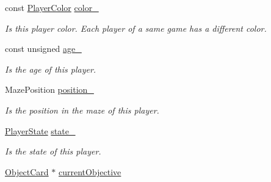 \begin{DoxyCompactItemize}
\item 
\mbox{\label{structlabyrinth_1_1_player_a64d4a2733ff15d2c0391a5d4bf54517b}} 
const \mbox{\hyperlink{structlabyrinth_1_1_player_a23119c6cf615f70b86380d07ab692c75}{Player\+Color}} \mbox{\hyperlink{structlabyrinth_1_1_player_a64d4a2733ff15d2c0391a5d4bf54517b}{color\+\_\+}}
\begin{DoxyCompactList}\small\item\em Is this player color. Each player of a same game has a different color. \end{DoxyCompactList}\item 
\mbox{\label{structlabyrinth_1_1_player_a242c12f987eb4968d0852709ea31b62b}} 
const unsigned \mbox{\hyperlink{structlabyrinth_1_1_player_a242c12f987eb4968d0852709ea31b62b}{age\+\_\+}}
\begin{DoxyCompactList}\small\item\em Is the age of this player. \end{DoxyCompactList}\item 
\mbox{\label{structlabyrinth_1_1_player_ae0010014587898c28b2cc8ba96b49a0f}} 
Maze\+Position \mbox{\hyperlink{structlabyrinth_1_1_player_ae0010014587898c28b2cc8ba96b49a0f}{position\+\_\+}}
\begin{DoxyCompactList}\small\item\em Is the position in the maze of this player. \end{DoxyCompactList}\item 
\mbox{\label{structlabyrinth_1_1_player_a7444c130e91067aeaf1a07687313fefc}} 
\mbox{\hyperlink{structlabyrinth_1_1_player_a55ad4d67aa82ce87e996416c85267e28}{Player\+State}} \mbox{\hyperlink{structlabyrinth_1_1_player_a7444c130e91067aeaf1a07687313fefc}{state\+\_\+}}
\begin{DoxyCompactList}\small\item\em Is the state of this player. \end{DoxyCompactList}\item 
\mbox{\label{structlabyrinth_1_1_player_a4206ec4231879716c0934fb75990760e}} 
\mbox{\hyperlink{structlabyrinth_1_1_object_card}{Object\+Card}} $\ast$ \mbox{\hyperlink{structlabyrinth_1_1_player_a4206ec4231879716c0934fb75990760e}{current\+Objective}}

\end{DoxyCompactItemize}
